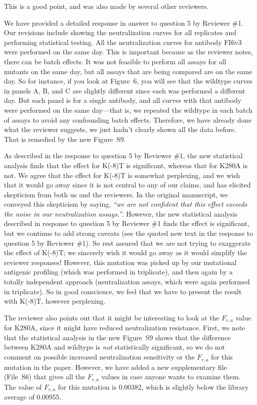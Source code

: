 \documentclass[11pt, oneside]{article}   	%
\begin{document}
{\color{black}
This is a good point, and was also made by several other reviewers.

We have provided a detailed response in answer to question 5 by Reviewer \#1.
Our revisions include showing the neutralization curves for all replicates and performing statistical testing.
All the neutralization curves for antibody FI6v3 were performed on the same day.
This is important because as the reviewer notes, there can be batch effects.
It was not feasible to perform all assays for all mutants on the same day, but all assays that are being compared are on the same day.
So for instance, if you look at Figure~6, you will see that the wildtype curves in panels A, B, and C are slightly different since each was performed a different day.
But each panel is for a single antibody, and all curves with that antibody were performed on the same day---that is, we repeated the wildtype in each batch of assays to avoid any confounding batch effects.
Therefore, we have already done what the reviewer suggests, we just hadn't clearly shown all the data before. 
That is remedied by the new Figure~S9.

As described in the response to question 5 by Reviewer \#1, the new statistical analysis finds that the effect for K(-8)T is significant, whereas that for K280A is not.
We agree that the effect for K(-8)T is somewhat perplexing, and we wish that it would go away since it is not central to any of our claims, and has elicited skepticism from both us and the reviewers.
In the original manuscript, we conveyed this skepticism by saying, \textsl{``we are not confident that this effect exceeds the noise in our neutralization assays.''}.
However, the new statistical analysis described in response to question 5 by Reviewer \#1 finds the effect is significant, but we continue to add strong caveats (see the quoted new text in the response to question 5 by Reviewer \#1). 
So rest assured that we are not trying to exaggerate the effect of K(-8)T; we sincerely wish it would go away as it would simplify the reviewer responses!
However, this mutation was picked up by our mutational antigenic profiling (which was performed in triplicate), and then again by a totally independent approach (neutralization assays, which were again performed in triplicate). 
So in good conscience, we feel that we have to present the result with K(-8)T, however perplexing.

The reviewer also points out that it might be interesting to look at the $F_{r,a}$ value for K280A, since it might have reduced neutralization resistance.
First, we note that the statistical analysis in the new Figure~S9 shows that the difference between K280A and wildtype is \emph{not} statistically significant, so we do not comment on possible increased neutralization sensitivity or the $F_{r,a}$ for this mutation in the paper.
However, we have added a new supplementary file (File~S6) that gives all the $F_{r,a}$ values in case anyone wants to examine them.
The value of $F_{r,a}$ for this mutation is 0.00382, which is slightly below the library average of 0.00955.
}
\end{document}

